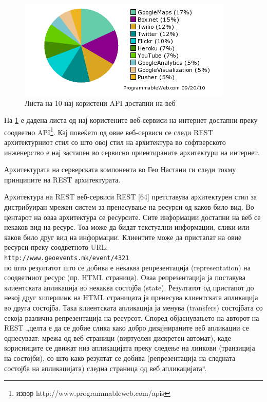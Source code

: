 \begin{figure}[htb]
\centering
\includegraphics[scale=0.4]{images/web-services}
\caption{Листа на 10 нај користени API достапни на веб}
\label{fig:web-services}
\end{figure}

На \ref{fig:web-services} е дадена листа од нај
користените веб-сервиси на интернет достапни преку соодветно API\footnote{извор
http://www.programmableweb.com/apis}. Кај повеќето
од овие веб-сервиси се следи REST архитектурниот стил со што овој стил на
архитектура во софтверското инженерство е нај застапен во сервисно ориентираните
архитектури на интернет. 

Архитектурата на серверската компонента во Гео Настани
ги следи токму принципите на REST архитектурата. 

Архитектура на REST веб-сервиси REST [64] претставува архитектурен стил за дистрибуиран мрежен систем за
пренесување на ресурси од каков било вид. Во центарот на оваа архитектура се
ресурсите. Сите информации достапни на веб се некаков вид на ресурс. Тоа може да
бидат текстуални информации, слики или каков било друг вид на информации.
Клиентите може да пристапат на овие ресурси преку соодветното URL:
\\[.5cm]
\texttt{http://www.geoevents.mk/event/4321}
\\[.5cm]
по што резултатот што се добива е некаква репрезентација (representation) на
соодветниот ресурс (пр. HTML страница). Оваа репрезентација ја поставува
клиентската апликација во некаква состојба (state). Резултатот од пристапот до
некој друг хиперлинк на HTML страницата ја пренесува клиентската апликација во
друга состојба. Така клиентската апликација ја менува (transfers) состојбата со
секоја различна репрезентација на ресурсот. Според објаснувањето на авторот на
REST „целта е да се добие слика како добро дизајнираните веб апликации се
однесуваат: мрежа од веб страници (виртуелен дискретен автомат), каде
корисниците се движат низ апликацијата преку следење на линкови (транзиција на
состојби), со што како резултат се добива (репрезентација на следната состојба
на апликацијата) следна страница од веб апликацијата“.

